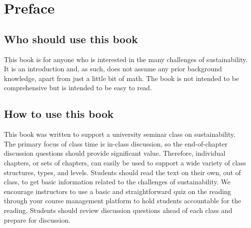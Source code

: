 {
\chapter*{Preface}
\thispagestyle{plain}

\noindent
\section*{Who should use this book} 
This book is for anyone who is interested in the many challenges of 
sustainability.
It is an introduction and, as such, does not assume any prior background knowledge,
apart from just a little bit of math.
The book is not intended to be comprehensive but is intended to be easy to read.\\

\section*{How to use this book} 
This book was written to support a university seminar class %
on sustainability. The primary focus of class time is in-class discussion, so 
the end-of-chapter discussion questions should provide significant value. 
Therefore, individual chapters, or sets of chapters, can easily be
used to support a wide variety of class structures, types, and levels.
Students should read the text on their own, out of class, to get 
basic information related to  the challenges of sustainability. 
We encourage instructors to use a basic and straightforward quiz on the reading 
through your course management platform to hold students accountable for the 
reading. 
Students should review discussion questions ahead of each class and 
prepare for discussion. \\

}
